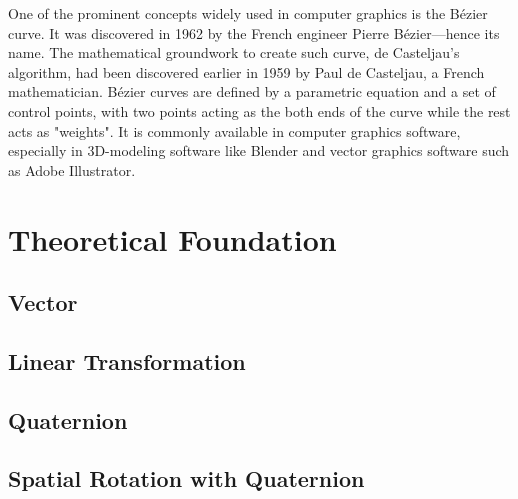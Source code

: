 \documentclass[conference]{IEEEtran}
\begin{document}
One of the prominent concepts widely used in computer graphics is the Bézier curve. It was discovered in 1962 by the French engineer Pierre Bézier---hence its name. The mathematical groundwork to create such curve, de Casteljau's algorithm, had been discovered earlier in 1959 by Paul de Casteljau, a French mathematician. Bézier curves are defined by a parametric equation and a set of control points, with two points acting as the both ends of the curve while the rest acts as "weights". It is commonly available in computer graphics software, especially in 3D-modeling software like Blender and vector graphics software such as Adobe Illustrator.

\section{Theoretical Foundation}
\subsection{Vector} 


\subsection{Linear Transformation} 


\subsection{Quaternion} 


\subsection{Spatial Rotation with Quaternion}

\end{document}
